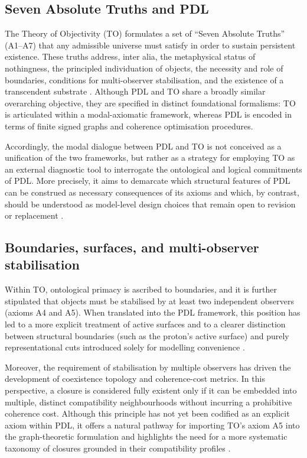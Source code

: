 \documentclass{article}
\begin{document}
\subsection{Seven Absolute Truths and PDL}
\label{subsec:TO_Axioms}

The Theory of Objectivity (TO) formulates a set of “Seven Absolute Truths” (A1–A7) that any admissible universe must satisfy in order to sustain persistent existence. These truths address, inter alia, the metaphysical status of nothingness, the principled individuation of objects, the necessity and role of boundaries, conditions for multi-observer stabilisation, and the existence of a transcendent substrate \citep{PDL_TO_dialogue}. Although PDL and TO share a broadly similar overarching objective, they are specified in distinct foundational formalisms: TO is articulated within a modal-axiomatic framework, whereas PDL is encoded in terms of finite signed graphs and coherence optimisation procedures.

Accordingly, the modal dialogue between PDL and TO is not conceived as a unification of the two frameworks, but rather as a strategy for employing TO as an external diagnostic tool to interrogate the ontological and logical commitments of PDL. More precisely, it aims to demarcate which structural features of PDL can be construed as necessary consequences of its axioms and which, by contrast, should be understood as model-level design choices that remain open to revision or replacement \citep{PDL_TO_dialogue,PDL_position}.

\subsection{Boundaries, surfaces, and multi-observer stabilisation}
\label{subsec:boundaries_multiobserver}

Within TO, ontological primacy is ascribed to boundaries, and it is further stipulated that objects must be stabilised by at least two independent observers (axioms A4 and A5). When translated into the PDL framework, this position has led to a more explicit treatment of active surfaces and to a clearer distinction between structural boundaries (such as the proton’s active surface) and purely representational cuts introduced solely for modelling convenience \citep{PDL_TO_dialogue,PDL_Main_2026}.

Moreover, the requirement of stabilisation by multiple observers has driven the development of coexistence topology and coherence-cost metrics. In this perspective, a closure is considered fully existent only if it can be embedded into multiple, distinct compatibility neighbourhoods without incurring a prohibitive coherence cost. Although this principle has not yet been codified as an explicit axiom within PDL, it offers a natural pathway for importing TO’s axiom A5 into the graph-theoretic formulation and highlights the need for a more systematic taxonomy of closures grounded in their compatibility profiles \citep{Coherence_Leakage_18_2026,PDL_position}.
\end{document}
